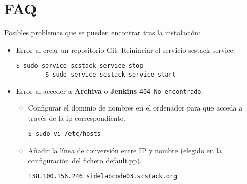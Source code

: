 \section{FAQ}
\label{sec:faq}

\par Posibles problemas que se pueden encontrar tras la instalación:

\begin{itemize}
    \item Error al crear un repositorio Git: Reininciar el servicio scstack-service:
    \lstset{style=bashbasico}
    \begin{lstlisting}[frame=trbl]
        $ sudo service scstack-service stop
        $ sudo service scstack-service start
    \end{lstlisting}

    \item Error al acceder a \textbf{Archiva} o \textbf{Jenkins} \texttt{404 No encontrado}.
    \begin{itemize}
        \item Configurar el dominio de nombres en el ordenador para que acceda a través de la ip correspondiente.

        \lstset{style=bashbasico}
        \begin{lstlisting}[frame=trbl]
            $ sudo vi /etc/hosts
        \end{lstlisting}

        \item Añadir la línea de conversión entre IP y nombre (elegido en la configuración del fichero default.pp).

        \lstset{style=bashbasico}
        \begin{lstlisting}[frame=trbl]
            138.100.156.246 sidelabcode03.scstack.org
        \end{lstlisting}
     \end{itemize}
\end{itemize}
